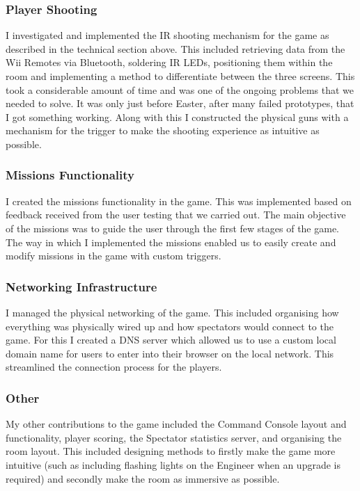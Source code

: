 \documentclass[a4paper,11pt]{article}
\begin{document}
\subsubsection{Player Shooting}
I investigated and implemented the IR shooting mechanism for the game as described in the technical section above. This included retrieving data from the Wii Remotes via Bluetooth, soldering IR LEDs, positioning them within the room and implementing a method to differentiate between the three screens. This took a considerable amount of time and was one of the ongoing problems that we needed to solve. It was only just before Easter, after many failed prototypes, that I got something working. Along with this I constructed the physical guns with a mechanism for the trigger to make the shooting experience as intuitive as possible.

\subsubsection{Missions Functionality}
I created the missions functionality in the game. This was implemented based on feedback received from the user testing that we carried out. The main objective of the missions was to guide the user through the first few stages of the game. The way in which I implemented the missions enabled us to easily create and modify missions in the game with custom triggers. 

\subsubsection{Networking Infrastructure}
I managed the physical networking of the game. This included organising how everything was physically wired up and how spectators would connect to the game. For this I created a DNS server which allowed us to use a custom local domain name for users to enter into their browser on the local network. This streamlined the connection process for the players. 
 
\subsubsection{Other}
My other contributions to the game included the Command Console layout and functionality, player scoring, the Spectator statistics server, and organising the room layout. This included designing methods to firstly make the game more intuitive (such as including flashing lights on the Engineer when an upgrade is required) and secondly make the room as immersive as possible.
\end{document}
